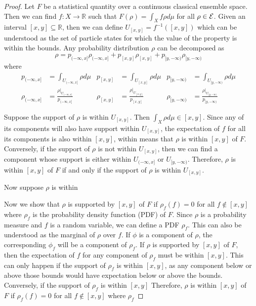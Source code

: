 \begin{proof}
	Let $F$ be a statistical quantity over a continuous classical ensemble space. Then we can find $f : X \to \mathbb{R}$ such that $F(\rho) = \int_X f \rho d\mu$ for all $\rho \in \mathcal{E}$. Given an interval $[x,y] \subseteq \mathbb{R}$, then we can define $U_{[x,y]} = f^{-1}([x,y])$ which can be understood as the set of particle states for which the value of the property is within the bounds. Any probability distribution $\rho$ can be decomposed as
	$$ \rho = p_{(-\infty, x]} \rho_{(-\infty, x]} + p_{[x,y]} \rho_{[x,y]} + p_{[y,-\infty)} \rho_{[y,-\infty)} $$
	where
	\begin{equation}
		\begin{aligned}
			p_{(-\infty, x]} &= \int_{U_{(-\infty, x]}} \rho d\mu &
			p_{[x,y]} &= \int_{U_{[x,y]}} \rho d\mu  &
			p_{[y,-\infty)} &= \int_{U_{[y,-\infty)}} \rho d\mu \\
			\rho_{(-\infty, x]} &= \frac{\left.\rho\right|_{U_{(-\infty, x]}}}{p_{(-\infty, x]}} &
			\rho_{[x,y]} &= \frac{\left.\rho\right|_{U_{[x,y]}}}{p_{[x,y]}} &
			\rho_{[y,-\infty)} &= \frac{\left.\rho\right|_{U_{[y,-\infty)}}}{p_{[y,-\infty)}}
		\end{aligned}
	\end{equation}
	
	Suppose the support of $\rho$ is within $U_{[x,y]}$. Then $\int_X \rho d\mu \in [x,y]$. Since any of its components will also have support within $U_{[x,y]}$, the expectation of $f$ for all its components is also within $[x,y]$, within means that $\rho$ is within $[x,y]$ of $F$. Conversely, if the support of $\rho$ is not within $U_{[x,y]}$, then we can find a component whose support is either within $U_{(-\infty, x]}$ or $U_{[y,-\infty)}$. Therefore, $\rho$ is within $[x,y]$ of $F$ if and only if the support of $\rho$ is within $U_{[x,y]}$.
	
	Now suppose $\rho$ is within 
	
	Now we show that $\rho$ is supported by $[x,y]$ of $F$ if $\rho_f(f) = 0$ for all $f \notin [x,y]$ where $\rho_f$ is the probability density function (PDF) of $F$. Since $\rho$ is a probability measure and $f$ is a random variable, we can define a PDF $\rho_f$. This can also be understood as the marginal of $\rho$ over $f$. If $\phi$ is a component of $\rho$, the corresponding $\phi_f$ will be a component of $\rho_f$. If $\rho$ is supported by $[x,y]$ of $F$, then the expectation of $f$ for any component of $\rho_f$ must be within $[x,y]$. This can only happen if the support of $\rho_f$ is within $[x,y]$, as any component below or above those bounds would have expectation below or above the bounds. Conversely, if the support of $\rho_f$ is within $[x,y]$ Therefore, $\rho$ is within $[x,y]$ of $F$ if $\rho_f(f) = 0$ for all $f \notin [x,y]$ where $\rho_f$
\end{proof}

